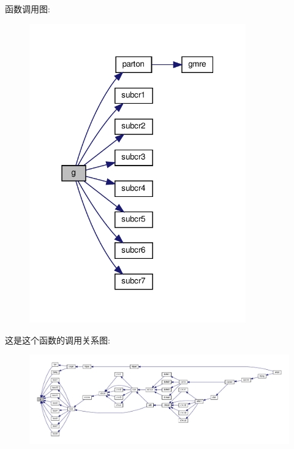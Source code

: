 函数调用图\+:
\nopagebreak
\begin{figure}[H]
\begin{center}
\leavevmode
\includegraphics[width=265pt]{g_8f90_ae6f69233cd20fb9f18eccb21a11b604f_cgraph}
\end{center}
\end{figure}
这是这个函数的调用关系图\+:
\nopagebreak
\begin{figure}[H]
\begin{center}
\leavevmode
\includegraphics[width=350pt]{g_8f90_ae6f69233cd20fb9f18eccb21a11b604f_icgraph}
\end{center}
\end{figure}
